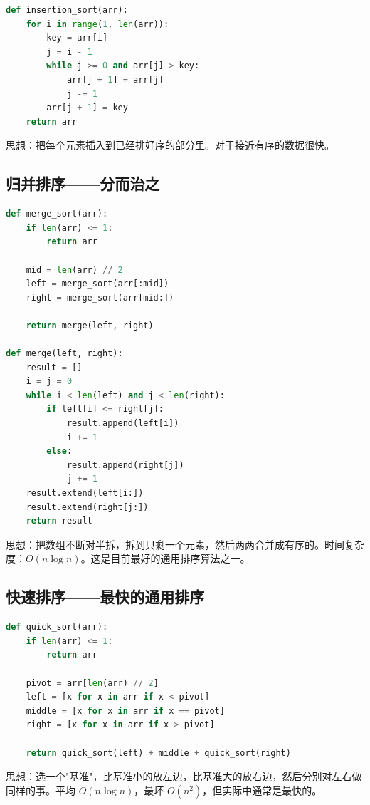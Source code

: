 \documentclass[a4paper,12pt]{ctexart}
\begin{document}
\begin{lstlisting}[language=Python]
def insertion_sort(arr):
    for i in range(1, len(arr)):
        key = arr[i]
        j = i - 1
        while j >= 0 and arr[j] > key:
            arr[j + 1] = arr[j]
            j -= 1
        arr[j + 1] = key
    return arr
\end{lstlisting}

思想：把每个元素插入到已经排好序的部分里。对于接近有序的数据很快。

\subsection*{归并排序——分而治之}

\begin{lstlisting}[language=Python]
def merge_sort(arr):
    if len(arr) <= 1:
        return arr
    
    mid = len(arr) // 2
    left = merge_sort(arr[:mid])
    right = merge_sort(arr[mid:])
    
    return merge(left, right)

def merge(left, right):
    result = []
    i = j = 0
    while i < len(left) and j < len(right):
        if left[i] <= right[j]:
            result.append(left[i])
            i += 1
        else:
            result.append(right[j])
            j += 1
    result.extend(left[i:])
    result.extend(right[j:])
    return result
\end{lstlisting}

思想：把数组不断对半拆，拆到只剩一个元素，然后两两合并成有序的。时间复杂度：$O(n \log n)$。这是目前最好的通用排序算法之一。

\subsection*{快速排序——最快的通用排序}

\begin{lstlisting}[language=Python]
def quick_sort(arr):
    if len(arr) <= 1:
        return arr
    
    pivot = arr[len(arr) // 2]
    left = [x for x in arr if x < pivot]
    middle = [x for x in arr if x == pivot]
    right = [x for x in arr if x > pivot]
    
    return quick_sort(left) + middle + quick_sort(right)
\end{lstlisting}

思想：选一个"基准"，比基准小的放左边，比基准大的放右边，然后分别对左右做同样的事。平均 $O(n \log n)$，最坏 $O(n^2)$，但实际中通常是最快的。
\end{document}
